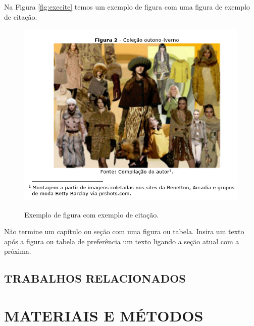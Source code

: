 \documentclass[
    12pt,				       %
    openright,			       %
    oneside,			       %
    a4paper,			       %
    chapter=TITLE,             %
    sumario=tradicional,       %
    english,			        %
    brazil, 				    %
 ]{abntex2}
\begin{document}
Na Figura \autoref{fig:execite} temos um exemplo de figura com uma figura de exemplo de citação.

\begin{figure}[!ht]
    \centering
    \caption{Exemplo de figura com exemplo de citação.}
    \includegraphics[width=0.95\linewidth]{figuras/execite.png}
    \label{fig:execite}
\end{figure}

Não termine um capítulo ou seção com uma figura ou tabela. Insira um texto após a figura ou tabela de preferência um texto ligando a seção atual com a próxima.

\section{\MakeUppercase{Trabalhos Relacionados}}\label{sec:TrabRel}


\chapter{\MakeUppercase{Materiais e Métodos}}\label{sec:metodos}
\end{document}
